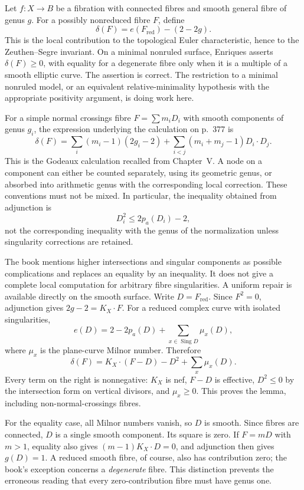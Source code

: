 Let $f:X\to B$ be a fibration with connected fibres and smooth general fibre of genus $g$. For a possibly nonreduced fibre $F$, define
\[
 \delta(F)=e(F_{\mathrm{red}})-(2-2g).
\]
This is the local contribution to the topological Euler characteristic, hence to the Zeuthen--Segre invariant. On a minimal nonruled surface, Enriques asserts $\delta(F)\geq0$, with equality for a degenerate fibre only when it is a multiple of a smooth elliptic curve. The assertion is correct. The restriction to a minimal nonruled model, or an equivalent relative-minimality hypothesis with the appropriate positivity argument, is doing work here.

For a simple normal crossings fibre $F=\sum m_iD_i$ with smooth components of genus $g_i$, the expression underlying the calculation on p.~377 is
\[
 \delta(F)=\sum_i(m_i-1)(2g_i-2)
 +\sum_{i<j}(m_i+m_j-1)D_i\cdot D_j.
\]
This is the Godeaux calculation recalled from Chapter~V. A node on a component can either be counted separately, using its geometric genus, or absorbed into arithmetic genus with the corresponding local correction. These conventions must not be mixed. In particular, the inequality obtained from adjunction is
\[
 D_i^2\leq2p_a(D_i)-2,
\]
not the corresponding inequality with the genus of the normalization unless singularity corrections are retained.

The book mentions higher intersections and singular components as possible complications and replaces an equality by an inequality. It does not give a complete local computation for arbitrary fibre singularities. A uniform repair is available directly on the smooth surface. Write $D=F_{\mathrm{red}}$. Since $F^2=0$, adjunction gives $2g-2=K_X\cdot F$. For a reduced complex curve with isolated singularities,
\[
 e(D)=2-2p_a(D)+\sum_{x\in\operatorname{Sing}D}\mu_x(D),
\]
where $\mu_x$ is the plane-curve Milnor number. Therefore
\begin{equation}
\label{cp2-x-defect}
 \delta(F)=K_X\cdot(F-D)-D^2+
 \sum_x\mu_x(D).
\end{equation}
Every term on the right is nonnegative: $K_X$ is nef, $F-D$ is effective, $D^2\leq0$ by the intersection form on vertical divisors, and $\mu_x\geq0$. This proves the lemma, including non-normal-crossings fibres.

For the equality case, all Milnor numbers vanish, so $D$ is smooth. Since fibres are connected, $D$ is a single smooth component. Its square is zero. If $F=mD$ with $m>1$, equality also gives $(m-1)K_X\cdot D=0$, and adjunction then gives $g(D)=1$. A reduced smooth fibre, of course, also has contribution zero; the book's exception concerns a \emph{degenerate} fibre. This distinction prevents the erroneous reading that every zero-contribution fibre must have genus one.

